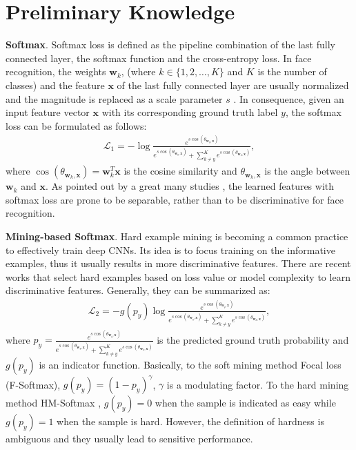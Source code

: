 \documentclass[10pt,twocolumn,letterpaper]{article}
\begin{document}
\section{Preliminary Knowledge}
\noindent \textbf{Softmax}. Softmax loss is defined as the pipeline combination of the last fully connected layer, the softmax function and the cross-entropy loss. In face recognition, the weights $\bm{w}_k$, (where $ k \in \{1,2,\dots,K\}$ and $K$ is the number of classes) and the feature $\bm{x}$ of the last fully connected layer are usually normalized and the magnitude is replaced as a scale parameter $s$ \cite{NormFace,AM-Softmax,Arc-Softmax}. In consequence, given an input feature vector $\bm{x}$ with its corresponding ground truth label $y$, the softmax loss can be formulated as follows:
\begin{equation}\label{Softmax}
\begin{aligned}
\mathcal{L}_1 = - \log\frac{e^{s\cos(\theta_{\bm{w}_y,\bm{x}})}}{e^{s\cos(\theta_{\bm{w}_y,\bm{x}})}+\sum_{k\ne y}^Ke^{s\cos(\theta_{\bm{w}_k,\bm{x}})}},
\end{aligned}
\end{equation}
where $\cos(\theta_{\bm{w}_k,\bm{x}})=\bm{w}_k^T\bm{x}$ is the cosine similarity and $\theta_{\bm{w}_k,\bm{x}}$ is the angle between $\bm{w}_k$ and $\bm{x}$. As pointed out by a great many studies \cite{L-softmax,SphereFace,AM-Softmax,Arc-Softmax}, the learned features with softmax loss are prone to be separable, rather than to be discriminative for face recognition.

\noindent \textbf{Mining-based Softmax}. Hard example mining is becoming a common practice to effectively train deep CNNs. Its idea is to focus training on the informative examples, thus it usually results in more discriminative features. There are recent works that select hard examples based on loss value \cite{OHEM,Focal} or model complexity \cite{Yuan} to learn discriminative features. Generally, they can be summarized as:
\begin{equation}\label{Mining-Softmax}
\begin{aligned}
\mathcal{L}_2 = -g(p_y) \log\frac{e^{s\cos(\theta_{\bm{w}_y,\bm{x}})}}{e^{s\cos(\theta_{\bm{w}_y,\bm{x}})}+\sum_{k\ne y}^Ke^{s\cos(\theta_{\bm{w}_k,\bm{x}})}},
\end{aligned}
\end{equation}
where $p_y=\frac{e^{s\cos(\theta_{\bm{w}_y,\bm{x}})}}{e^{s\cos(\theta_{\bm{w}_y,\bm{x}})}+\sum_{k\ne y}^Ke^{s\cos(\theta_{\bm{w}_k,\bm{x}})}}$ is the predicted ground truth probability and $g(p_y)$ is an indicator function. Basically, to the soft mining method Focal loss \cite{Focal} (F-Softmax), $g(p_y)=(1-p_y)^\gamma$, $\gamma$ is a modulating factor. To the hard mining method HM-Softmax \cite{OHEM}, $g(p_y)=0$ when the sample is indicated as easy while $g(p_y)=1$ when the sample is hard. However, the definition of hardness is ambiguous and they usually lead to sensitive performance.
\end{document}
